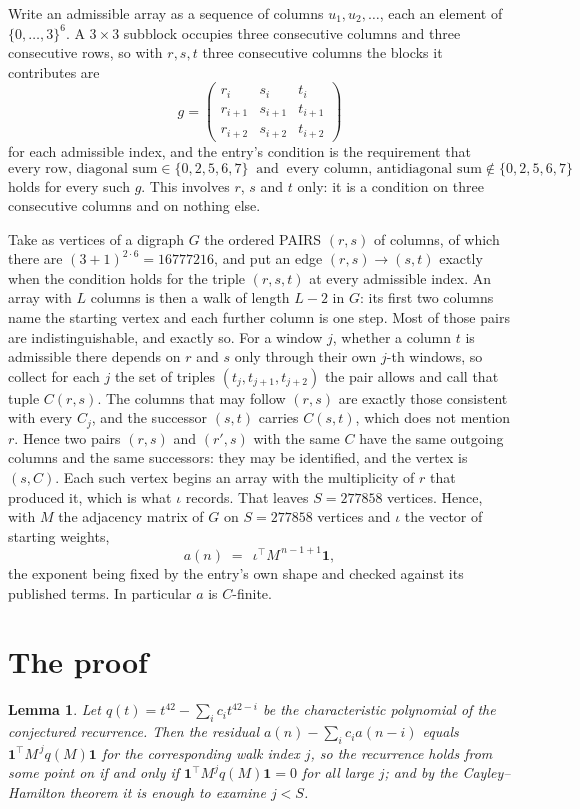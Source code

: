 \documentclass[11pt,a4paper]{article}
\theoremstyle{plain}
\newtheorem{lemma}[theorem]{Lemma}
\theoremstyle{definition}
\begin{document}
Write an admissible array as a sequence of columns $u_1,u_2,\dots$, each an element of
$\{0,\dots,3\}^{6}$. A $3\times3$ subblock occupies three consecutive columns and
three consecutive rows, so with $r,s,t$ three consecutive columns the blocks it
contributes are
\[
g=\begin{pmatrix}r_i&s_i&t_i\\ r_{i+1}&s_{i+1}&t_{i+1}\\ r_{i+2}&s_{i+2}&t_{i+2}\end{pmatrix}
\]
for each admissible index, and the entry's condition is the requirement that
\[
\text{every row, diagonal sum} \in \{0,2,5,6,7\}\ \text{ and }\ \text{every column, antidiagonal sum} \notin \{0,2,5,6,7\}
\]
holds for every such $g$. This involves $r$, $s$ and $t$ only: it is a condition on
three consecutive columns and on nothing else.

Take as vertices of a digraph $G$ the ordered PAIRS $(r,s)$ of columns, of which there are
$(3+1)^{2\cdot6}=16777216$, and put an edge $(r,s)\to(s,t)$ exactly when the condition
holds for the triple $(r,s,t)$ at every admissible index. An array with $L$ columns is then a
walk of length $L-2$ in $G$: its first two columns name the starting vertex and each further
column is one step. Most of those pairs are indistinguishable, and exactly so. For a window $j$, whether a column $t$ is admissible there depends on $r$ and $s$ only through their own $j$-th windows, so collect for each $j$ the set of triples $(t_j,t_{j+1},t_{j+2})$ the pair allows and call that tuple $C(r,s)$. The columns that may follow $(r,s)$ are exactly those consistent with every $C_j$, and the successor $(s,t)$ carries $C(s,t)$, which does not mention $r$. Hence two pairs $(r,s)$ and $(r',s)$ with the same $C$ have the same outgoing columns and the same successors: they may be identified, and the vertex is $(s,C)$. Each such vertex begins an array with the multiplicity of $r$ that produced it, which is what $\iota$ records. That leaves $S=277858$ vertices. Hence, with $M$ the adjacency matrix of $G$ on $S=277858$ vertices and
$\iota$ the vector of starting weights,
\[
a(n)\;=\;\,\iota^{\!\top}M^{\,n-1+1}\mathbf{1},
\]
the exponent being fixed by the entry's own shape and checked against its published terms.
In particular $a$ is $C$-finite.

\section{The proof}

\begin{lemma}\label{lem:crit}
Let $q(t)=t^{42}-\sum_i c_it^{42-i}$ be the characteristic polynomial of the
conjectured recurrence. Then the residual $a(n)-\sum_ic_ia(n-i)$ equals
$\mathbf{1}^{\!\top}M^{\,j}q(M)\mathbf{1}$ for the corresponding walk index
$j$, so the recurrence holds from some point on if and only if
$\mathbf{1}^{\!\top}M^{j}q(M)\mathbf{1}=0$ for all large $j$; and by the
Cayley--Hamilton theorem it is enough to examine $j<S$.
\end{lemma}
\end{document}
